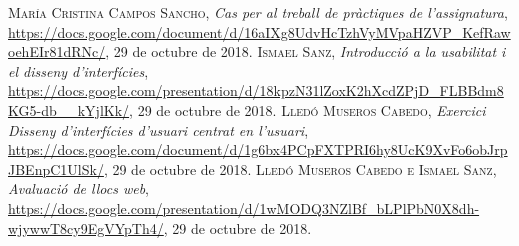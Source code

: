 \documentclass[pdftex,11pt,a4paper]{book}
\begin{document}
%
%

\begin{thebibliography}{X}
 \textsc{María Cristina Campos Sancho},
 \textit{Cas per al treball de pràctiques de l'assignatura},
 \url{https://docs.google.com/document/d/16aIXg8UdvHcTzhVyMVpaHZVP_KefRawoehEIr81dRNc/},
  29 de octubre de 2018.
 \textsc{Ismael Sanz},
 \textit{Introducció a la usabilitat i el disseny d'interfícies},
 \url{https://docs.google.com/presentation/d/18kpzN31lZoxK2hXcdZPjD_FLBBdm8KG5-db__kYjlKk/},
  29 de octubre de 2018.
 \textsc{Lledó Museros Cabedo},
 \textit{Exercici Disseny d’interfícies d’usuari centrat en l’usuari},
 \url{https://docs.google.com/document/d/1g6bx4PCpFXTPRI6hy8UcK9XvFo6obJrpJBEnpC1UlSk/},
  29 de octubre de 2018.
 \textsc{Lledó Museros Cabedo e Ismael Sanz},
 \textit{Avaluació de llocs web},
 \url{https://docs.google.com/presentation/d/1wMODQ3NZlBf_bLPlPbN0X8dh-wjywwT8cy9EgVYpTh4/},
  29 de octubre de 2018.
\end{thebibliography}



\appendix




\end{document}
